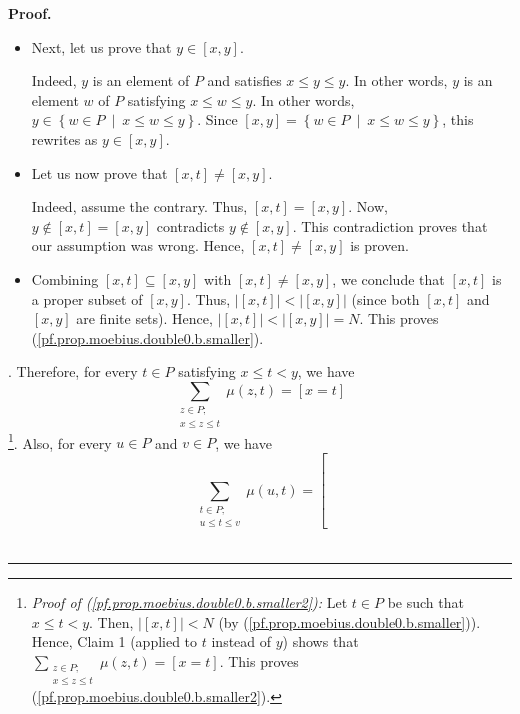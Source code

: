\documentclass[numbers=enddot,12pt,final,onecolumn,notitlepage]{scrartcl}%
\theoremstyle{definition}
\newenvironment{proof}[1][Proof]{\noindent\textbf{#1.} }{\ \rule{0.5em}{0.5em}}
\newenvironment{verlong}{}{}
\let\sumnonlimits\sum
\renewcommand{\sum}{\sumnonlimits\limits}
\begin{document}
\begin{verlong}
\begin{proof}
{\begin{itemize}
\item Next, let us prove that $y\in\left[  x,y\right]  $.
\par
Indeed, $y$ is an element of $P$ and satisfies $x\leq y\leq y$. In other
words, $y$ is an element $w$ of $P$ satisfying $x\leq w\leq y$. In other
words, $y\in\left\{  w\in P\ \mid\ x\leq w\leq y\right\}  $. Since $\left[
x,y\right]  =\left\{  w\in P\ \mid\ x\leq w\leq y\right\}  $, this rewrites as
$y\in\left[  x,y\right]  $.
\par
\item Let us now prove that $\left[  x,t\right]  \neq\left[  x,y\right]  $.
\par
Indeed, assume the contrary. Thus, $\left[  x,t\right]  =\left[  x,y\right]
$. Now, $y\notin\left[  x,t\right]  =\left[  x,y\right]  $ contradicts
$y\notin\left[  x,y\right]  $. This contradiction proves that our assumption
was wrong. Hence, $\left[  x,t\right]  \neq\left[  x,y\right]  $ is proven.
\par
\item Combining $\left[  x,t\right]  \subseteq\left[  x,y\right]  $ with
$\left[  x,t\right]  \neq\left[  x,y\right]  $, we conclude that $\left[
x,t\right]  $ is a proper subset of $\left[  x,y\right]  $. Thus, $\left\vert
\left[  x,t\right]  \right\vert <\left\vert \left[  x,y\right]  \right\vert $
(since both $\left[  x,t\right]  $ and $\left[  x,y\right]  $ are finite
sets). Hence, $\left\vert \left[  x,t\right]  \right\vert <\left\vert \left[
x,y\right]  \right\vert =N$. This proves
(\ref{pf.prop.moebius.double0.b.smaller}).
\end{itemize}
}. Therefore, for every $t\in P$ satisfying $x\leq t<y$, we have%
\begin{equation}
\sum_{\substack{z\in P;\\x\leq z\leq t}}\mu\left(  z,t\right)  =\left[
x=t\right]  \label{pf.prop.moebius.double0.b.smaller2}%
\end{equation}
\footnote{\textit{Proof of (\ref{pf.prop.moebius.double0.b.smaller2}):} Let
$t\in P$ be such that $x\leq t<y$. Then, $\left\vert \left[  x,t\right]
\right\vert <N$ (by (\ref{pf.prop.moebius.double0.b.smaller})). Hence, Claim 1
(applied to $t$ instead of $y$) shows that $\sum_{\substack{z\in P;\\x\leq
z\leq t}}\mu\left(  z,t\right)  =\left[  x=t\right]  $. This proves
(\ref{pf.prop.moebius.double0.b.smaller2}).}. Also, for every $u\in P$ and
$v\in P$, we have%
\begin{equation}
\sum_{\substack{t\in P;\\u\leq t\leq v}}\mu\left(  u,t\right)  =\left[

\end{equation}
\end{proof}
\end{verlong}
\end{document}
